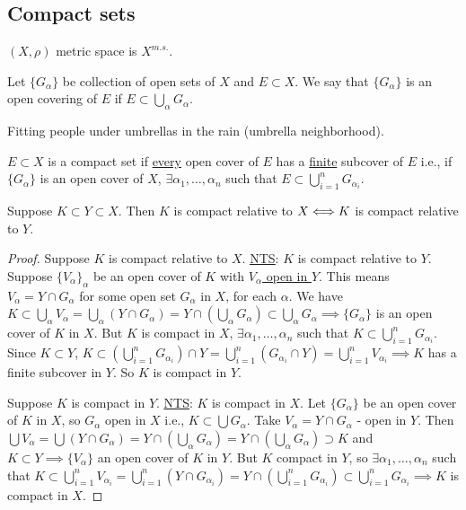 \documentclass[]{article}
\begin{document}
\subsection{Compact sets}
$(X,\rho)$ metric space is $X^{m.s.}$.
\begin{definition}
	 Let $\{G_\alpha\}$ be collection of open sets of $X$ and $E\subset X$.
	We say that $\{G_\alpha\}$ is an open covering of $E$ if $E\subset\bigcup_\alpha G_\alpha$.
\end{definition}
\begin{remark}
	Fitting people under umbrellas in the rain (umbrella neighborhood).
\end{remark}
\begin{definition}
	 $E\subset X$ is a compact set if \ul{every} open cover of $E$ has a \ul{finite} subcover of $E$ i.e., if $\{G_\alpha\}$ is an open cover of $X$, $\exists \alpha_1,\dots,\alpha_n$ such that $E\subset \bigcup_{i=1}^n G_{\alpha_i}$.
\end{definition}

\begin{theorem}
	Suppose $K\subset Y\subset X$. Then $K$ is compact relative to $X \Longleftrightarrow K$ is compact relative to $Y$.
\end{theorem}
\begin{proof}
	\say{$\implies$} Suppose $K$ is compact relative to $X$.
	\ul{\ul{NTS}}: $K$ is compact relative to $Y$. Suppose $\{V_\alpha\}_\alpha$ be an open cover of $K$ with \ul{$V_\alpha$ open in $Y$}.
	This means $V_\alpha = Y\cap G_\alpha$ for some open set $G_\alpha$ in $X$, for each $\alpha$.
	We have $K\subset\bigcup_\alpha V_\alpha = \bigcup_\alpha (Y\cap G_\alpha) = Y\cap \left(\bigcup_\alpha G_\alpha\right) \subset \bigcup_\alpha G_\alpha \implies \{G_\alpha\}$ is an open cover of $K$ in $X$. But $K$ is compact in $X$, $\exists \alpha_1,\dots,\alpha_n$ such that $K\subset \bigcup_{i=1}^n G_{\alpha_i}$.
	Since $K\subset Y$, $K\subset \left( \bigcup_{i=1}^n G_{\alpha_i} \right) \cap Y = \bigcup_{i=1}^n (G_{\alpha_i} \cap Y) = \bigcup_{i=1}^n V_{\alpha_i} \implies K$ has a finite subcover in $Y$.
	So $K$ is compact in $Y$.

	\say{$\Lla$} Suppose $K$ is compact in $Y$.
	\ul{\ul{NTS}}: $K$ is compact in $X$.
	Let $\{G_\alpha\}$ be an open cover of $K$ in $X$, so $G_\alpha$ open in $X$ i.e., $K\subset \bigcup G_\alpha$.
	Take $V_\alpha = Y\cap G_\alpha$ - open in $Y$.
	Then $\bigcup V_\alpha = \bigcup (Y\cap G_\alpha) = Y\cap\left( \bigcup_\alpha G_\alpha\right) = Y\cap \left( \bigcup_\alpha G_\alpha \right) \supset K$ and $K\subset Y \implies \{V_\alpha\}$ an open cover of $K$ in $Y$.
	But $K$ compact in $Y$, so $\exists \alpha_1,\dots,\alpha_n$ such that $K\subset \bigcup_{i=1}^n V_{\alpha_i} = \bigcup_{i=1}^n (Y\cap G_{\alpha_i}) = Y\cap \left( \bigcup_{i=1}^n G_{\alpha_i} \right) \subset \bigcup_{i=1}^n G_{\alpha_i} \implies K$ is compact in $X$.
\end{proof}
\end{document}
